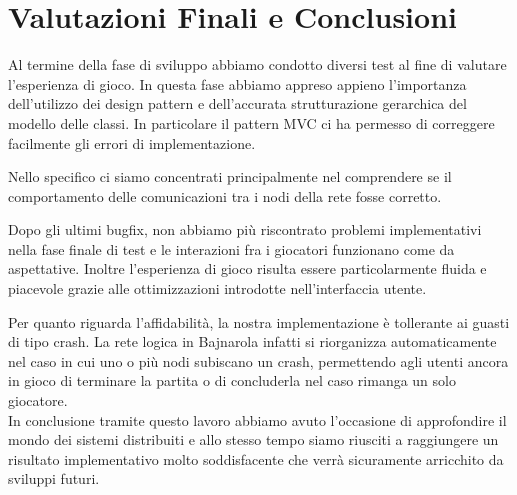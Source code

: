\section{Valutazioni Finali e Conclusioni}
Al termine della fase di sviluppo abbiamo condotto diversi test al fine
di valutare l'esperienza di gioco.
In questa fase abbiamo appreso appieno l'importanza dell'utilizzo dei
design pattern e dell'accurata strutturazione gerarchica del modello delle
classi. In particolare il pattern MVC ci ha permesso di correggere
facilmente gli errori di implementazione.

Nello specifico ci siamo concentrati
principalmente nel comprendere se il comportamento delle comunicazioni
tra i nodi della rete fosse corretto.

Dopo gli ultimi bugfix, non abbiamo più riscontrato problemi implementativi
nella fase finale di test e le interazioni fra i giocatori funzionano
come da aspettative. Inoltre l'esperienza di gioco risulta essere
particolarmente fluida e piacevole grazie alle ottimizzazioni introdotte
nell'interfaccia utente.

Per quanto riguarda l'affidabilità, la nostra implementazione è
tollerante ai guasti di tipo crash. La rete logica in Bajnarola infatti si
riorganizza automaticamente nel caso in cui uno o più nodi subiscano un
crash, permettendo agli utenti ancora in gioco di terminare la partita o
di concluderla nel caso rimanga un solo giocatore.\\

In conclusione tramite questo lavoro abbiamo avuto l'occasione di
approfondire il mondo dei sistemi distribuiti e allo stesso tempo
siamo riusciti a raggiungere un risultato implementativo molto
soddisfacente che verrà sicuramente arricchito da sviluppi futuri.
